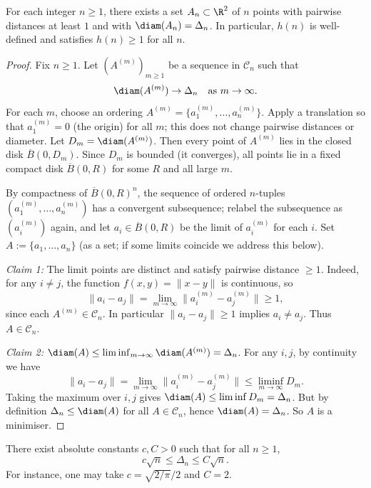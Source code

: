 \begin{lemma}
For each integer $n\ge 1$, there exists a set $A_n\subset\R^2$ of $n$ points with pairwise distances at least $1$ and with $\diam(A_n)=\Delta_n$.
In particular, $h(n)$ is well-defined and satisfies $h(n)\ge 1$ for all $n$.
\end{lemma}

\begin{proof}
Fix $n\ge 1$.
Let $(A^{(m)})_{m\ge 1}$ be a sequence in $\mathcal{C}_n$ such that
\[\diam(A^{(m)})\to \Delta_n\quad\text{as }m\to\infty.
\]
For each $m$, choose an ordering $A^{(m)}=\{a^{(m)}_1,\dots,a^{(m)}_n\}$.
Apply a translation so that $a^{(m)}_1=0$ (the origin) for all $m$; this does not change pairwise distances or diameter.
Let $D_m=\diam(A^{(m)})$.
Then every point of $A^{(m)}$ lies in the closed disk $\overline{B}(0,D_m)$.
Since $D_m$ is bounded (it converges), all points lie in a fixed compact disk $\overline{B}(0,R)$ for some $R$ and all large $m$.

By compactness of $\overline{B}(0,R)^n$, the sequence of ordered $n$-tuples $(a^{(m)}_1,\dots,a^{(m)}_n)$ has a convergent subsequence; relabel the subsequence as $(a^{(m)}_i)$ again, and let $a_i\in\overline{B}(0,R)$ be the limit of $a^{(m)}_i$ for each $i$.
Set $A:=\{a_1,\dots,a_n\}$ (as a set; if some limits coincide we address this below).

\emph{Claim 1:} The limit points are distinct and satisfy pairwise distance $\ge 1$.
Indeed, for any $i\ne j$, the function $f(x,y)=\|x-y\|$ is continuous, so
\[\|a_i-a_j\|=\lim_{m\to\infty}\|a^{(m)}_i-a^{(m)}_j\|\ge 1,
\]
since each $A^{(m)}\in\mathcal{C}_n$.
In particular $\|a_i-a_j\|\ge 1$ implies $a_i\ne a_j$.
Thus $A\in\mathcal{C}_n$.

\emph{Claim 2:} $\diam(A)\le \liminf_{m\to\infty}\diam(A^{(m)})=\Delta_n$.
For any $i,j$, by continuity we have
\[\|a_i-a_j\|=\lim_{m\to\infty}\|a^{(m)}_i-a^{(m)}_j\|\le \liminf_{m\to\infty} D_m.
\]
Taking the maximum over $i,j$ gives $\diam(A)\le \liminf D_m=\Delta_n$.
But by definition $\Delta_n\le \diam(A)$ for all $A\in\mathcal{C}_n$, hence $\diam(A)=\Delta_n$.
So $A$ is a minimiser.
\end{proof}

\begin{proposition}
There exist absolute constants $c,C>0$ such that for all $n\ge 1$,
\[c\sqrt{n} \le \Delta_n \le C\sqrt{n}.
\]
For instance, one may take $c=\sqrt{2/\pi}/2$ and $C=2$.
\end{proposition}

